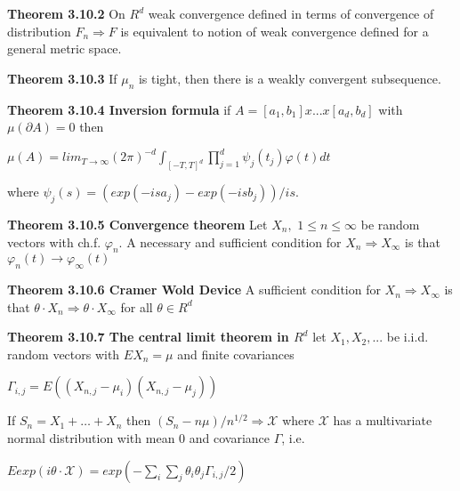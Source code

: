 \documentclass{article}
\begin{document}
\textbf {Theorem 3.10.2} On $R^d$ weak convergence defined in terms of convergence of distribution $F_n \Rightarrow F$ is equivalent to notion of weak convergence defined for a general metric space.

\textbf {Theorem 3.10.3} If $\mu_n$ is tight, then there is a weakly convergent subsequence.

\textbf {Theorem 3.10.4 Inversion formula} if $A = [a_1 , b_1] x ... x [a_d, b_d]$ with $\mu(\partial A) = 0$ then
\begin{center}
$\mu(A) = lim_{T \to \infty} (2\pi)^{-d} \int_{[-T, T]^d} \prod_{j=1}^d \psi_j(t_j) \varphi(t) dt$
\end{center}
where $\psi_j(s) = (exp(-isa_j) -exp(-isb_j))/is.$

\textbf {Theorem 3.10.5 Convergence theorem} Let $X_n,$ $1 \leq n \leq \infty$ be random vectors with ch.f. $\varphi_n$. A necessary and sufficient condition for $X_n \Rightarrow X_\infty$ is that $\varphi_n(t) \to \varphi_\infty(t)$

\textbf {Theorem 3.10.6 Cramer Wold Device} A sufficient condition for $X_n \Rightarrow X_\infty$ is that $\theta \cdot X_n \Rightarrow \theta \cdot X_\infty$ for all $\theta \in R^d$

\textbf {Theorem 3.10.7 The central limit theorem in $R^d$} let $X_1, X_2 ,...$ be i.i.d. random vectors with $EX_n = \mu$ and finite covariances 
\begin{center}
$\Gamma_{i,j} = E((X_{n,j} - \mu_i)(X_{n,j} - \mu_j))$
\end{center}
If $S_n = X_1 + \dots + X_n$ then $(S_n - n\mu)/n^{1/2} \Rightarrow \mathcal{X}$ where $\mathcal{X}$ has a multivariate normal distribution with mean 0 and covariance $\Gamma$, i.e.
\begin{center}
$Eexp(i\theta \cdot \mathcal{X}) = exp (- \sum_i \sum_j \theta_i \theta_j \Gamma_{i,j} / 2)$
\end{center}
\end{document}
